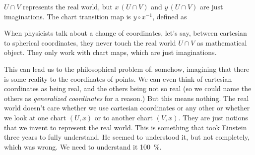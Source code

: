 $U\cap V$ represents the real world, but $x\,(U\cap V)$ and $y\,(U\cap V)$ are just imaginations.
The chart transition map is $y\circ x^{-1}$, defined as 
\begin{center}
  \def\dist{.6}
\end{center}
When physicists talk about a change of coordinates, let's say, between cartesian to spherical
coordinates, they never touch the real world $U\cap V$ as mathematical object. They only work
with chart maps, which are just imaginations.

This can lead us to the philosophical problem of. somehow, imagining that there is some reality
to the coordinates of points. We can even think of cartesian coordinates as being
real, and the others being not so real (so we could name the others as
\emph{generalized coordinates} for a reason.)
But this means nothing. The real world doesn't care whether we use cartesian coordinates or
any other or whether we look at one chart $(U,x)$ or to another chart $(V,x)$.
They are just notions that we invent to represent the real world.
This is something that took Einstein three years to fully understand.
He seemed to understood it, but not completely, which was wrong. We need to understand it
\SI{100}{\percent}.

